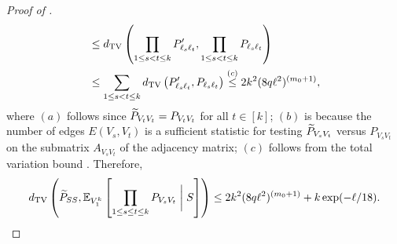 \begin{proof}[Proof of ]
\begin{align*}
& \le  d_{\rm TV} \left( \prod_{1\leq s<t \leq k} P'_{\ell_s \ell_t},  \prod_{1\leq s<t \leq k} P_{\ell_s \ell_t} \right) \nonumber \\
& \le \sum_{ 1 \le s< t \le k} d_{\rm TV} \left(   P'_{\ell_s \ell_t},  P_{\ell_s \ell_t} \right) \overset{(c)}{\le} 2 k^2 (8q \ell^2)^{(m_0+1)},
\end{align*}
where $(a)$ follows since ${\widetilde{P}}_{V_tV_t}=P_{V_tV_t}$ for all $t \in [k]$;
 $(b)$ is because the number of edges $E(V_s,V_t)$ is a sufficient statistic for testing ${\widetilde{P}}_{V_sV_t}$ versus $P_{V_sV_t}$ on the submatrix $A_{V_sV_t}$ of the adjacency matrix; $(c)$ follows from the total variation
 bound . 
 Therefore,
\begin{align}
d_{\rm TV} \left(  {\widetilde{P}}_{SS},  \mathbb{E}_{V_1^k} \left [  \prod_{1 \le s \le t \le k} P_{V_sV_t} \biggm \vert S \right]\right) \le 2 k^2 (8q \ell^2)^{(m_0+1)} +k \exp(-\ell/18).\label{eq:TotalVariationNondiagonal}
\end{align}


\end{proof}
